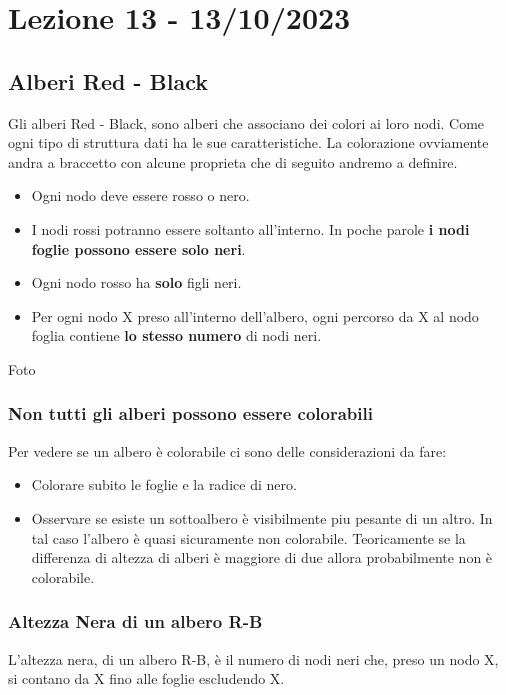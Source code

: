 \section{Lezione 13 - 13/10/2023}

\subsection{Alberi Red - Black}
Gli alberi Red - Black, sono alberi che associano dei colori ai loro nodi. Come ogni tipo di struttura dati ha le sue caratteristiche. La colorazione ovviamente andra a braccetto con alcune proprieta che di seguito andremo a definire.

\begin{itemize}	
	\item Ogni nodo deve essere rosso o nero.
	\item I nodi rossi potranno essere soltanto all'interno. In poche parole \textbf{i nodi foglie possono essere solo neri}.
	\item Ogni nodo rosso ha \textbf{solo} figli neri.
	\item Per ogni nodo X preso all'interno dell'albero, ogni percorso da X al nodo foglia contiene \textbf{lo stesso numero} di nodi neri.
\end{itemize}

Foto

\subsubsection{Non tutti gli alberi possono essere colorabili}

Per vedere se un albero è colorabile ci sono delle considerazioni da fare:

\begin{itemize}
    \item Colorare subito le foglie e la radice di nero.
    \item Osservare se esiste un sottoalbero è visibilmente piu pesante di un altro. In tal caso l'albero è quasi sicuramente non colorabile. Teoricamente se la differenza di altezza di alberi è maggiore di due allora probabilmente non è colorabile.
\end{itemize}

\subsubsection{Altezza Nera di un albero R-B}
L'altezza nera, di un albero R-B, è il numero di nodi neri che, preso un nodo X, si contano da X fino alle foglie escludendo X.

